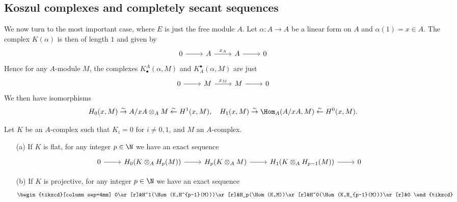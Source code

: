 \subsection{Koszul complexes and completely secant sequences}
We now turn to the most important case, where $E$ is just the free module $A$. Let $\alpha:A\to A$ be a linear form on $A$ and $\alpha(1)=x\in A$. The complex $K(\alpha)$ is then of length $1$ and given by
\[\begin{tikzcd}
0\ar[r]&A\ar[r,"x_A"]&A\ar[r]&0
\end{tikzcd}\]
Hence for any $A$-module $M$, the complexes $K_\bullet^A(\alpha,M)$ and $K^\bullet_A(\alpha,M)$ are just
\[\begin{tikzcd}
0\ar[r]&M\ar[r,"x_M"]&M\ar[r]&0
\end{tikzcd}\]
We then have isomorphisms
\[H_0(x,M)\stackrel{\sim}{\to} A/xA\otimes_AM\stackrel{\sim}{\leftarrow} H^1(x,M),\quad H_1(x,M)\stackrel{\sim}{\to}\Hom_A(A/xA,M)\stackrel{\sim}{\leftarrow} H^0(x,M).\]
\begin{lemma}\label{module complex tensoring and Hom with homology lemma}
Let $K$ be an $A$-complex such that $K_i=0$ for $i\neq 0,1$, and $M$ an $A$-complex.
\begin{itemize}
\item[(a)] If $K$ is flat, for any integer $p\in\N$ we have an exact sequence
\[\begin{tikzcd}
0\ar[r]&H_0(K\otimes_AH_p(M))\ar[r]&H_p(K\otimes_AM)\ar[r]&H_1(K\otimes_AH_{p-1}(M))\ar[r]&0
\end{tikzcd}\] 
\item[(b)] If $K$ is projective, for any integer $p\in\N$ we have an exact sequence
\[\begin{tikzcd}[column sep=4mm]
0\ar[r]&H^1(\Hom(K,H^{p-1}(M)))\ar[r]&H_p(\Hom(K,M))\ar[r]&H^0(\Hom(K,H_{p-1}(M)))\ar[r]&0
\end{tikzcd}\] 
\end{itemize}
\end{lemma}
